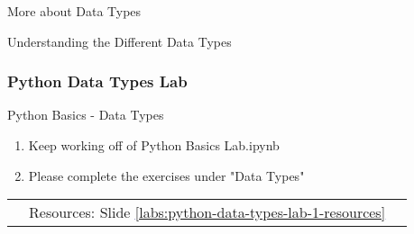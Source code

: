 \documentclass[handout, 11pt]{beamer}
\begin{document}
\begin{section}{More about Data Types}
\begin{frame}
{\begin{block}{Understanding the Different Data Types}
\begin{itemize}
\end{itemize}
\end{block}
}
\end{frame}
\begin{frame}
\frametitle{Python Data Types Lab}
{
\begin{block}{Python Basics - Data Types}
\begin{enumerate}
\item Keep working off of Python Basics Lab.ipynb
\item Please complete the exercises under "Data Types"
\end{enumerate}
\vfill
\begin{tabular*}{\textwidth}{@{\extracolsep{\fill}}ccc}
\toprule
\hfill & Resources: Slide \textcolor{blue}{\underline{\ref{labs:python-data-types-lab-1-resources}}} & \hfill\\

\end{tabular*}
\end{block}
}
\label{labs:python-data-types-lab-1}
\end{frame}
\end{section}
\end{document}
